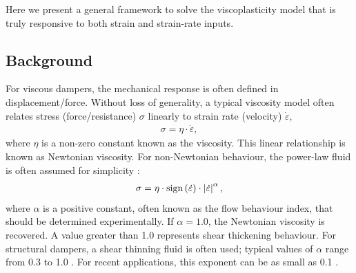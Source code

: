 Here we present a general framework \cite{Chang2022a} to solve the viscoplasticity model that is truly responsive to both strain and strain-rate inputs.
\subsection{Background}
For viscous dampers, the mechanical response is often defined in displacement/force.
Without loss of generality, a typical viscosity model often relates stress (force/resistance) $\sigma$ linearly to strain rate (velocity) $\dot{\varepsilon}$,
\begin{gather}
\sigma=\eta\cdot\dot{\varepsilon},
\end{gather}
where $\eta$ is a non-zero constant known as the viscosity.
This linear relationship is known as Newtonian viscosity.
For non-Newtonian behaviour, the power-law fluid is often assumed for simplicity \cite{Wu2016}:
\begin{gather}
\sigma=\eta\cdot\text{sign}\left(\dot{\varepsilon}\right)\cdot\left\lvert\dot{\varepsilon}\right\rvert^{\alpha},
\end{gather}
where $\alpha$ is a positive constant, often known as the flow behaviour index, that should be determined experimentally.
If $\alpha=1.0$, the Newtonian viscosity is recovered.
A value greater than \num{1.0} represents shear thickening behaviour.
For structural dampers, a shear thinning fluid is often used; typical values of $\alpha$ range from \num{0.3} to \num{1.0} \cite{Lee2001}.
For recent applications, this exponent can be as small as \num{0.1} \cite{Lago2018}.

